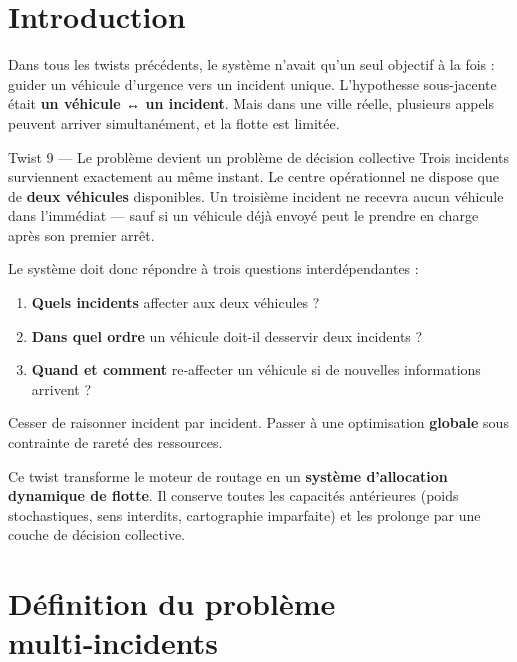 \documentclass[12pt,a4paper]{article}
\theoremstyle{definition}
\theoremstyle{remark}
\begin{document}
\tableofcontents
\newpage

\section*{Introduction}

Dans tous les twists précédents, le système n’avait qu’un seul objectif
à la fois : guider un véhicule d’urgence vers un incident unique.
L’hypothesse sous-jacente était \textbf{un véhicule ↔ un incident}.
Mais dans une ville réelle, plusieurs appels peuvent arriver simultanément,
et la flotte est limitée.

\begin{twistbox}{Twist 9 — Le problème devient un problème de décision collective}
Trois incidents surviennent exactement au même instant. Le centre opérationnel
ne dispose que de \textbf{deux véhicules} disponibles. Un troisième incident
ne recevra aucun véhicule dans l’immédiat — sauf si un véhicule déjà envoyé
peut le prendre en charge après son premier arrêt.

\medskip
Le système doit donc répondre à trois questions interdépendantes :
\begin{enumerate}[leftmargin=1.5em]
  \item \textbf{Quels incidents} affecter aux deux véhicules ?
  \item \textbf{Dans quel ordre} un véhicule doit-il desservir deux incidents ?
  \item \textbf{Quand et comment} re‑affecter un véhicule si de nouvelles
        informations arrivent ?
\end{enumerate}
Cesser de raisonner incident par incident. Passer à une optimisation
\textbf{globale} sous contrainte de rareté des ressources.
\end{twistbox}

Ce twist transforme le moteur de routage en un \textbf{système d’allocation
dynamique de flotte}. Il conserve toutes les capacités antérieures (poids
stochastiques, sens interdits, cartographie imparfaite) et les prolonge
par une couche de décision collective.

\newpage

\section{Définition du problème multi‑incidents}
\end{document}
